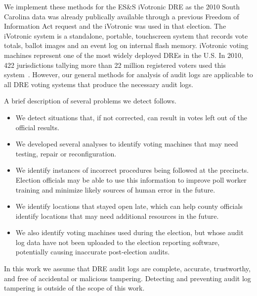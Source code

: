We implement these methods for the ES\&S iVotronic DRE as the 2010 South
Carolina data was already publically available through a previous
Freedom of Information Act request and the iVotronic was used in that election. 
The iVotronic system is a
standalone, portable, touchscreen system that records vote totals,
ballot images and an event log on internal flash 
memory. 
iVotronic voting machines represent one of the most widely deployed
DREs in the U.S. In 2010, 422 jurisdictions tallying more than 22
million registered voters used this system~\cite{VerVot2010}. However, our
general methods for analysis of audit logs 
are applicable to all DRE voting systems  that produce the necessary
audit logs.  

A brief description of several problems we detect follows.
\smvertspace
\begin{itemize}
\item We detect situations that, if not corrected, can result in votes left out
of the official results.  
\item We developed several analyses to identify voting machines that may need
testing, repair or reconfiguration. 
\item We identify instances of incorrect procedures being followed at the
precincts. Election officials may be able to use this information to improve 
poll worker training and minimize likely sources of human error in the future. 
\item  We identify locations that stayed open late, which can help county
officials identify locations that may need additional resources in the future.  
\item We also identify voting machines used during the election, but whose audit log data 
have not been uploaded to the election reporting software, potentially causing
inaccurate post-election audits.  
\end{itemize}
In this work we assume that DRE audit logs are complete, accurate,  trustworthy, and free of accidental or malicious tampering. Detecting and preventing audit log tampering is outside of the scope of this work.

\begin{comment}
In summary, this paper develops and implements new ways that audit log data can
be used meaningfully and in an automated fashion to enhance the accuracy and
efficiency of elections. We believe our tool will provide useful feedback to
election administrators during the canvassing process. We hope that this study
illustrates the potential value of voting systems' audit logs and motivates
future election technologies to provide enhanced support for these purposes.
\end{comment}



